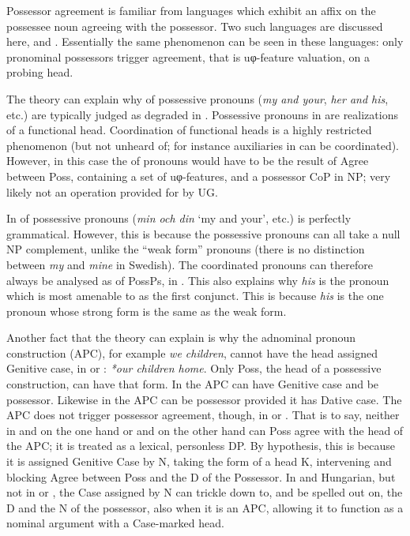 \documentclass[output=paper]{langsci/langscibook}
\begin{document}
Possessor agreement is familiar from languages which exhibit an affix on the
possessee noun agreeing with the possessor. Two such languages are discussed
here,  and . Essentially the same phenomenon can be seen in
these languages: only pronominal possessors trigger agreement, that is
uφ-feature valuation, on a probing head.

The theory can explain why  of possessive pronouns (\emph{my and
your}, \emph{her and his}, etc.) are typically judged as degraded in .
Possessive pronouns in  are realizations of a functional head.
Coordination of functional heads is a highly restricted phenomenon (but not
unheard of; for instance auxiliaries in  can be coordinated). However,
in this case the  of pronouns would have to be the result of Agree
between Poss, containing a set of uφ-features, and a possessor CoP in NP; very
likely not an operation provided for by UG.

In   of possessive pronouns (\emph{min och din} `my and
your', etc.) is perfectly grammatical. However, this is because the 
possessive pronouns can all take a null NP complement, unlike the 
\enquote{weak form} pronouns (there is no distinction between \emph{my} and
\emph{mine} in Swedish). The coordinated pronouns can therefore always be
analysed as  of PossPs, in . This also explains why
\emph{his} is the  pronoun which is most amenable to  as the
first conjunct.  This is because \emph{his} is the one pronoun whose strong
form is the same as the weak form.

Another fact that the theory can explain is why the adnominal pronoun
construction (\gls{APC}), for example
\emph{we children}, cannot have the head assigned Genitive
case, in  or : \emph{*our children home}. Only Poss, the head of
a possessive construction, can have that form. In  the APC can have
Genitive case and be possessor. Likewise in  the
\gls{APC} can be possessor provided it has
Dative case. The \gls{APC} does not trigger
possessor agreement, though, in  or . That is to say, neither
in  and  on the one hand or  and  on the other
hand can Poss agree with the head of the APC; it is treated as a lexical,
personless DP. By hypothesis, this is because it is assigned
Genitive Case by N, taking the form of a head K, intervening
and blocking Agree between Poss and the D of the Possessor. In  and
Hungarian, but not in  or , the Case assigned by N can trickle
down to, and be spelled out on, the D and the N of the possessor, also when it
is an \gls{APC}, allowing it to function as
a nominal argument with a Case-marked head.
\end{document}
